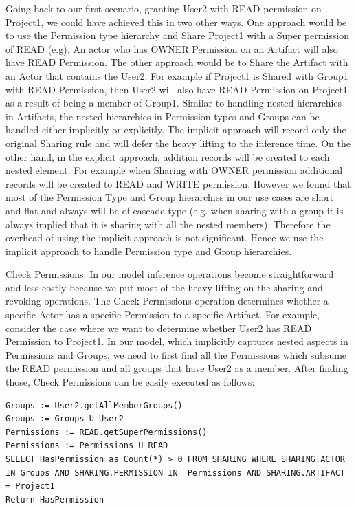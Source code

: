 \documentclass[sigconf]{acmart}
\begin{document}
Going back to our first scenario, granting User2 with READ permission on Project1, we could have achieved this in two other ways. One approach would be to use the Permission type hierarchy and Share Project1 with a Super permission of READ (e.g). An actor who has OWNER Permission on an Artifact will also have READ Permission. The other approach would be to Share the Artifact with an Actor that contains the User2. For example if Project1 is Shared with Group1 with READ Permission, then User2 will also have READ Permission on Project1 as a result of being a member of Group1. Similar to handling nested hierarchies in Artifacts, the nested hierarchies in Permission types and Groups can be handled either implicitly or explicitly. The implicit approach will record only the original Sharing  rule and will defer the heavy lifting to the inference time. On the other hand, in the explicit approach, addition records will be created to each nested element. For example when Sharing with OWNER permission additional records will be created to READ and WRITE permission. However we found that most of the Permission Type and Group hierarchies in our use cases are short and flat and always will be of cascade type (e.g. when sharing with a group it is always implied that it is sharing with all the nested members). Therefore the overhead of using the implicit approach is not significant. Hence we use the implicit approach to handle Permission type and Group hierarchies.

Check Permissions: In our model inference operations become straightforward and less costly because we put most of the heavy lifting on the sharing and revoking operations. The Check Permissions operation determines whether a specific Actor has a specific Permission to a specific Artifact. For example, consider the case where we want to determine whether User2 has READ Permission to Project1. In our model, which implicitly captures nested aspects in Permissions and Groups, we need to first find all the Permissions which subsume the READ permission and all groups that have User2 as a member. After finding those, Check Permissions can be easily executed as follows:

\begin{lstlisting}
Groups := User2.getAllMemberGroups()
Groups := Groups U User2
Permissions := READ.getSuperPermissions()
Permissions := Permissions U READ
SELECT HasPermission as Count(*) > 0 FROM SHARING WHERE SHARING.ACTOR IN Groups AND SHARING.PERMISSION IN  Permissions AND SHARING.ARTIFACT = Project1
Return HasPermission
\end{lstlisting}
\end{document}

